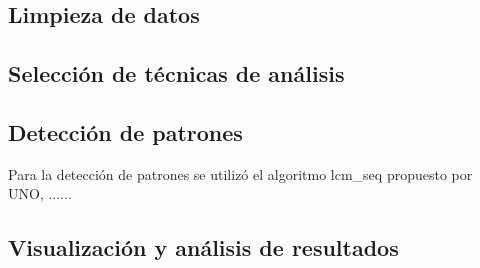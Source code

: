 \subsection{Limpieza de datos}


\subsection{Selección de técnicas de análisis}

\subsection{Detección de patrones}

Para la detección de patrones se utilizó el algoritmo lcm\_seq propuesto por UNO, ......

\subsection{Visualización y análisis de resultados}






